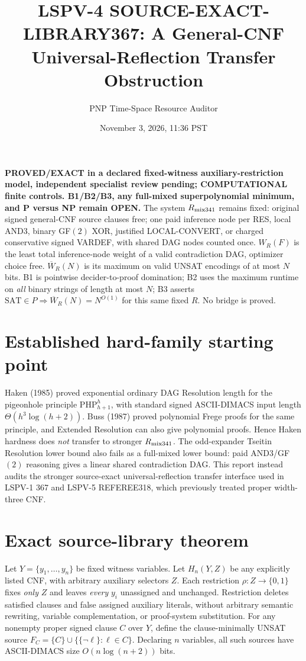 \documentclass[11pt]{article}
\title{LSPV-4 SOURCE-EXACT-LIBRARY367: A General-CNF Universal-Reflection Transfer Obstruction}
\author{PNP Time-Space Resource Auditor}
\date{November 3, 2026, 11:36 PST}
\begin{document}
\maketitle
\noindent\textbf{PROVED/EXACT in a declared fixed-witness auxiliary-restriction model, independent specialist review pending; COMPUTATIONAL finite controls. B1/B2/B3, any full-mixed superpolynomial minimum, and P versus NP remain OPEN.}
The system $R_{\rm mix341}$ remains fixed: original signed general-CNF source clauses free; one paid inference node per RES, local AND3, binary GF$(2)$ XOR, justified LOCAL-CONVERT, or charged conservative signed VARDEF, with shared DAG nodes counted once. $W_R(F)$ is the least total inference-node weight of a valid contradiction DAG, optimizer choice free. $\overline W_R(N)$ is its maximum on valid UNSAT encodings of at most $N$ bits. B1 is pointwise decider-to-proof domination; B2 uses the maximum runtime on \emph{all} binary strings of length at most $N$; B3 asserts $\mathrm{SAT}\in P\Longrightarrow\overline W_R(N)=N^{O(1)}$ for this same fixed $R$. No bridge is proved.

\section*{Established hard-family starting point}
Haken (1985) proved exponential ordinary DAG Resolution length for the pigeonhole principle $\mathrm{PHP}_{h+1}^h$, with standard signed ASCII-DIMACS input length $\Theta(h^3\log(h+2))$. Buss (1987) proved polynomial Frege proofs for the same principle, and Extended Resolution can also give polynomial proofs. Hence Haken hardness does \emph{not} transfer to stronger $R_{\rm mix341}$. The odd-expander Tseitin Resolution lower bound also fails as a full-mixed lower bound: paid AND3/GF$(2)$ reasoning gives a linear shared contradiction DAG. This report instead audits the stronger source-exact universal-reflection transfer interface used in LSPV-1 367 and LSPV-5 REFEREE318, which previously treated proper width-three CNF.

\section*{Exact source-library theorem}
Let $Y=\{y_1,\dots,y_n\}$ be fixed witness variables. Let $H_n(Y,Z)$ be any explicitly listed CNF, with arbitrary auxiliary selectors $Z$. Each restriction $\rho:Z\to\{0,1\}$ fixes \emph{only} $Z$ and leaves \emph{every} $y_i$ unassigned and unchanged. Restriction deletes satisfied clauses and false assigned auxiliary literals, without arbitrary semantic rewriting, variable complementation, or proof-system substitution. For any nonempty proper signed clause $C$ over $Y$, define the clause-minimally UNSAT source $F_C=\{C\}\cup\{\{\neg\ell\}:\ell\in C\}$. Declaring $n$ variables, all such sources have ASCII-DIMACS size $O(n\log(n+2))$ bits.
\end{document}
